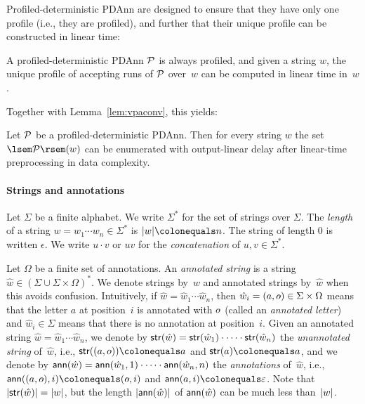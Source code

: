 %
%


%
%
%
%
%
%
%
%


%
%

%
%
%
%
%
%
%
%
%
%
%
%
%
%
%
%
%
%
%
%
%

Profiled-deterministic PDAnn are designed to ensure that they have only one
profile (i.e., they are profiled), and further that their unique
profile can be constructed in linear time:

\begin{proposition}\label{prp:detlinear}
  A profiled-deterministic PDAnn $\mathcal{P}$ is always profiled, and given a string
  $w$, the unique profile of accepting runs of $\mathcal{P}$ over~$w$ can be computed in
  linear time in~$w$.
\end{proposition}

Together with Lemma~\ref{lem:vpaconv}, this yields:

\begin{corollary}\label{cor:linear-time-pdann}
	Let $\mathcal{P}$ be a profiled-deterministic PDAnn. Then for every string $w$
        the set $\sem{\cP}(w)$ can be enumerated with output-linear delay after
        linear-time preprocessing in data complexity.
\end{corollary}


%
%

%

\paragraph{Strings and annotations} Let $\Sigma$ be a finite alphabet.
We write $\Sigma^*$ for the set of strings
over $\Sigma$. The \emph{length} of a string $w = w_1 \cdots w_n \in
\Sigma^*$ is $|w| \colonequals n$. The string of length 0 is written
$\epsilon$. We write $u \cdot v$ or $uv$ for the \emph{concatenation} of $u, v \in \Sigma^*$.

Let $\Omega$ be a finite set of annotations. An
\emph{annotated string} is a string $\hat{w} \in  (\Sigma \cup \Sigma \times \Omega)^*$. 
We denote strings by~$w$ and annotated strings by~$\hat{w}$ when this avoids confusion. 
Intuitively, if $\hat{w} = \hat{w}_1 \cdots \hat{w}_n$, then $\hat{w}_i = (a, \oout) \in \Sigma \times \Omega$ means that the letter $a$ at position~$i$ is annotated with $\oout$ (called an \emph{annotated letter}) and $\hat{w}_i \in \Sigma$ means that there is no annotation at position~$i$. 
Given an annotated string $\hat{w} = \hat{w}_1 \cdots \hat{w}_n$, we denote by
$\mathsf{str}(\hat{w}) = \mathsf{str}(\hat{w}_1) \cdot
\cdots \cdot \mathsf{str}(\hat{w}_n)$ the \emph{unannotated string} of~$\hat{w}$, i.e., $\str((a,
\oout)) \colonequals a$ and $\str(a) \colonequals a$, and we denote by
$\mathsf{ann}(\hat{w}) = \mathsf{ann}(\hat{w}_1, 1) \cdot \cdots \cdot \mathsf{ann}( \hat{w}_n, n)$
the \emph{annotations} of~$\hat{w}$, i.e.,
$\ann((a, \oout), i) \colonequals (\oout, i)$ and $\ann(a, i) \colonequals
\epsilon$.
%
Note that $\left|\mathsf{str}(\hat{w})\right| = \left|w\right|$, but the length
$\left|\mathsf{ann}(\hat{w})\right|$ of $\mathsf{ann}(\hat{w})$ can be
much less than~$\left|w\right|$.
%
%
%

